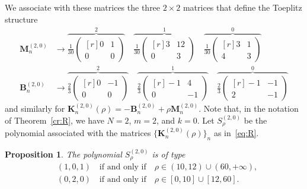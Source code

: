 \documentclass[addpoints,12pt,letter]{article}
\newcommand{\nf}{\infty}
\newcommand{\SR}{S}
\numberwithin{equation}{section}
\newtheorem{proposition}[lemma]{Proposition}
\theoremstyle{definition}
\begin{document}
We associate with these matrices the three $2\times 2$ matrices that define the Toeplitz structure
\begin{align}\label{eq:412}
\mathbf{M}_{n}^{(2,0)} &\to
\overbrace{\frac{1}{30}\begin{pmatrix}[r]
0 & 1
\\ 0 & 0
\end{pmatrix}}^{2}
\quad
\overbrace{\frac{1}{30}\begin{pmatrix}[r]
3 & 12
\\ 0 & 3
\end{pmatrix}}^{1}
\quad
\overbrace{\frac{1}{30}\begin{pmatrix}[r]
3 & 1
\\ 4 & 3
\end{pmatrix}}^{0}
\\
\mathbf{B}_{n}^{(2,0)} &\to
\overbrace{\frac{2}{3}\begin{pmatrix}[r]
0 &-1
\\ 0 & 0
\end{pmatrix}}^{2}
\quad
\overbrace{\frac{2}{3}\begin{pmatrix}[r]
-1 & 4
\\ 0 &-1
\end{pmatrix}}^{1}
\quad
\overbrace{\frac{2}{3}\begin{pmatrix}[r]
-1 &-1
\\ 2 &-1
\end{pmatrix}}^{0}
\label{eq:413}
\end{align}
and similarly for $\mathbf{K}_{n}^{(2,0)}(\rho)=-\mathbf{B}_{n}^{(2,0)}+\rho\mathbf{M}_{n}^{(2,0)}$.
Note that, in the notation of Theorem~\ref{cr:R}, we have $N=2$, $m=2$, and $k=0$.
Let $\SR_{\rho}^{(2,0)}$ be the polynomial associated with the matrices $\{\mathbf{K}_{n}^{(2,0)}(\rho)\}_{n}$ as in~\eqref{eq:R}.

\begin{proposition} \label{prop:51}
The polynomial $\SR_{\rho}^{(2,0)}$ is of type
\begin{align*}
&(1,0,1)\quad\text{if and only if}\quad\rho\in (10,12)\cup (60,+\nf),\\
&(0,2,0)\quad\text{if and only if}\quad\rho\in [0,10]\cup [12,60].
\end{align*}
\end{proposition}
\end{document}
